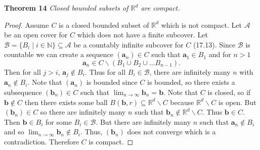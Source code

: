 \documentclass{article}
\begin{document}
\begin{flushleft}
\textbf{Theorem 14}
\textsl{Closed bounded subsets of $\mathbb{R}^d$ are compact.}
\begin{proof}
Assume $C$ is a closed bounded subset of $\mathbb{R}^d$ which is not compact. Let $\mathcal{A}$ be an open cover for $C$ which does not have a finite subcover. Let $\mathcal{B} = \{B_i \mid i \in \mathbb{N}\} \subseteq \mathcal{A}$ be a countably infinite subcover for $C$ (17.13). Since $\mathcal{B}$ is countable we can create a sequence $(\mathbf{a}_n) \in C$ such that $\mathbf{a}_1 \in B_1$ and for $n>1$
\[
\mathbf{a}_n \in C \backslash (B_1 \cup B_2 \cup \dots B_{n-1}).
\]
Then for all $j > i$, $\mathbf{a}_j \notin B_i$. Thus for all $B_i \in \mathcal{B}$, there are infinitely many $n$ with $\mathbf{a}_n \notin B_i$. Note that $(\mathbf{a}_n)$ is bounded since $C$ is bounded, so there exists a subsequence $(\mathbf{b}_n) \in C$ such that $\lim_{n \rightarrow \infty} \mathbf{b}_n = \mathbf{b}$. Note that $C$ is closed, so if $\mathbf{b} \notin C$ then there exists some ball $B(\mathbf{b}, r) \subseteq \mathbb{R}^d \backslash C$ because $\mathbb{R}^d \backslash C$ is open. But $(\mathbf{b}_n) \in C$ so there are infinitely many $n$ such that $\mathbf{b}_n \notin \mathbb{R}^d \backslash C$. Thus $\mathbf{b} \in C$. Then $\mathbf{b} \in B_i$ for some $B_i \in \mathcal{B}$. But there are infinitely many $n$ such that $\mathbf{a}_n \notin B_i$ and so $\lim_{n \rightarrow \infty} \mathbf{b}_n \notin B_i$. Thus, $(\mathbf{b}_n)$ does not converge which is a contradiction. Therefore $C$ is compact.
\end{proof}

\end{flushleft}
\end{document}
